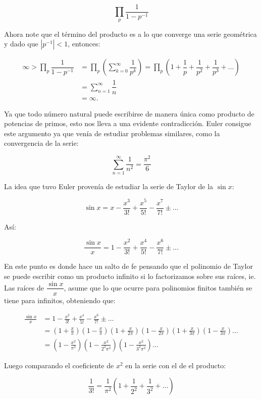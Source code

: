 $$\prod_p \dfrac{1}{1-p^{-1}}$$

Ahora note que el término del producto es a lo que converge una serie geométrica y dado que $|p^{-1}|<1$, entonces:

\begin{align*}
    \infty>\prod_p \dfrac{1}{1-p^{-1}}&=\prod_p \left(\sum_{k=0}^{\infty}\dfrac{1}{p^k}\right)=\prod_p \left(1+\dfrac{1}{p}+\dfrac{1}{p^2}+\dfrac{1}{p^3}+\ldots\right)\\
    &=\sum_{n=1}^{\infty}\dfrac{1}{n}\\
    &=\infty
.\end{align*}

Ya que todo número natural puede escribirse de manera única como producto de potencias de primos, esto nos lleva a una evidente contradicción. Euler consigue este argumento ya que venía de estudiar problemas similares, como la convergencia de la serie:

$$\sum_{n=1}^{\infty}\frac{1}{n^2}=\frac{\pi^2}{6}$$

La idea que tuvo Euler provenía de estudiar la serie de Taylor de la $\sin x$:

$$\sin x=x-\frac{x^3}{3!}+\frac{x^5}{5!}-\frac{x^7}{7!}\pm \ldots$$

Así:

$$\frac{\sin x}{x}=1-\frac{x^2}{3!}+\frac{x^4}{5!}-\frac{x^6}{7!}\pm\ldots$$

En este punto es donde hace un salto de fe pensando que el polinomio de Taylor se puede escribir como un producto infinito si lo factorizamos sobre sus raíces, ie. Las  raíces de $\dfrac{\sin x}{x}$, asume que lo que ocurre para polinomios finitos también se tiene para infinitos, obteniendo que:

\begin{align*}
    \frac{\sin x}{x}&=1-\frac{x^2}{3!}+\frac{x^4}{5!}-\frac{x^6}{7!}\pm\ldots\\
    &=\left(1+\frac{x}{\pi}\right)\left(1-\frac{x}{\pi}\right)\left(1+\frac{x}{2\pi}\right)\left(1-\frac{x}{2\pi}\right)\left(1+\frac{x}{3\pi}\right)\left(1-\frac{x}{3\pi}\right)\ldots\\
&=\left(1-\frac{x^2}{\pi^2}\right)\left(1-\frac{x^2}{2^2\pi^2}\right)\left(1-\frac{x^2}{3^2\pi^2}\right)\ldots
\end{align*}

Luego comparando el coeficiente de $x^2$ en la serie con el de el producto:

$$\frac{1}{3!}=\frac{1}{\pi^2}\left(1+\frac{1}{2^2}+\frac{1}{3^2}+\ldots\right)$$

